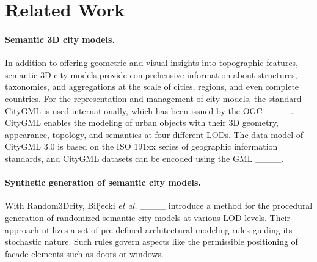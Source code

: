\section{Related Work}
\paragraph{Semantic 3D city models.}
In addition to offering geometric and visual insights into topographic features, semantic 3D city models provide comprehensive information about structures, taxonomies, and aggregations at the scale of cities, regions, and even complete countries. %
For the representation and management of city models, the standard CityGML is used internationally, which has been issued by the \gls{OGC} ____.
CityGML enables the modeling of urban objects
with their 3D geometry, appearance, topology, and semantics at four different \glspl{LOD}.
The data model of CityGML 3.0 is based on the ISO 191xx series of geographic information standards, and CityGML datasets can be encoded using the \gls{GML} ____.

\paragraph{Synthetic generation of semantic city models.}
With Random3Dcity, Biljecki \textit{et al.} ____ introduce a method for the procedural generation of randomized semantic city models at various \gls{LOD} levels.
Their approach utilizes a set of pre-defined architectural modeling rules guiding its stochastic nature.
Such rules govern aspects like the permissible positioning of facade elements such as doors or windows.

